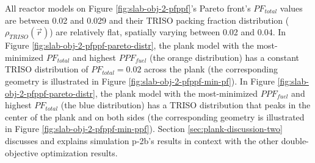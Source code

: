 All reactor models on Figure \ref{fig:slab-obj-2-pfppf}'s Pareto front's $PF_{total}$ 
values are between 0.02 and 0.029 and their TRISO packing fraction distribution 
($\rho_{TRISO}(\vec{r})$) are relatively flat, spatially varying between 0.02 and 0.04. 
In Figure \ref{fig:slab-obj-2-pfppf-pareto-distr}, the plank model with the 
most-minimized $PF_{total}$ and highest $PPF_{fuel}$
(the orange distribution) has a constant TRISO distribution of $PF_{total}=0.02$ 
across the plank (the corresponding geometry is illustrated in Figure 
\ref{fig:slab-obj-2-pfppf-min-pf}). 
In Figure \ref{fig:slab-obj-2-pfppf-pareto-distr}, the plank model with the 
most-minimized $PPF_{fuel}$ and highest $PF_{total}$
(the blue distribution) has a TRISO distribution that peaks in the center of the plank
and on both sides (the corresponding geometry is illustrated in 
Figure \ref{fig:slab-obj-2-pfppf-min-ppf}). 
Section \ref{sec:plank-discussion-two} discusses and explains simulation p-2b's results
in context with the other double-objective optimization results.

